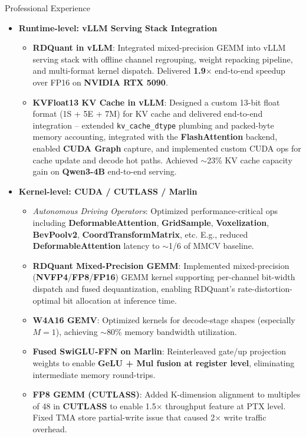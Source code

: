 \documentclass{resume} %
\begin{document}
\begin{rSection}{Professional Experience}
\begin{itemize}
\item \textbf{Runtime-level: vLLM Serving Stack Integration}
\begin{itemize}
  \item \textbf{RDQuant in vLLM}: Integrated mixed-precision GEMM into vLLM serving stack with offline channel regrouping, weight repacking pipeline, and multi-format kernel dispatch. Delivered \textbf{1.9$\times$} end-to-end speedup over FP16 on \textbf{NVIDIA RTX 5090}.
  \item \textbf{KVFloat13 KV Cache in vLLM}: Designed a custom 13-bit float format (1S + 5E + 7M) for KV cache and delivered end-to-end integration -- extended \texttt{kv\_cache\_dtype} plumbing and packed-byte memory accounting, integrated with the \textbf{FlashAttention} backend, enabled \textbf{CUDA Graph} capture, and implemented custom CUDA ops for cache update and decode hot paths. Achieved $\sim$23\% KV cache capacity gain on \textbf{Qwen3-4B} end-to-end serving.
\end{itemize}

\item \textbf{Kernel-level: CUDA / CUTLASS / Marlin}
\begin{itemize}
  \item \textit{Autonomous Driving Operators}: Optimized performance-critical ops including \textbf{DeformableAttention}, \textbf{GridSample}, \textbf{Voxelization}, \textbf{BevPoolv2}, \textbf{CoordTransformMatrix}, etc. E.g., reduced \textbf{DeformableAttention} latency to $\sim$1/6 of MMCV baseline.
  \item \textbf{RDQuant Mixed-Precision GEMM}: Implemented mixed-precision (\textbf{NVFP4}/\textbf{FP8}/\textbf{FP16}) GEMM kernel supporting per-channel bit-width dispatch and fused dequantization, enabling RDQuant's rate-distortion-optimal bit allocation at inference time.
  \item \textbf{W4A16 GEMV}: Optimized kernels for decode-stage shapes (especially $M\!=\!1$), achieving $\sim$80\% memory bandwidth utilization.
  \item \textbf{Fused SwiGLU-FFN on Marlin}: Reinterleaved gate/up projection weights to enable \textbf{GeLU + Mul fusion at register level}, eliminating intermediate memory round-trips.
  \item \textbf{FP8 GEMM (CUTLASS)}: Added K-dimension alignment to multiples of 48 in \textbf{CUTLASS} to enable 1.5$\times$ throughput feature at PTX level. Fixed TMA store partial-write issue that caused 2$\times$ write traffic overhead.
\end{itemize}


\end{itemize}
\end{rSection}
\end{document}

